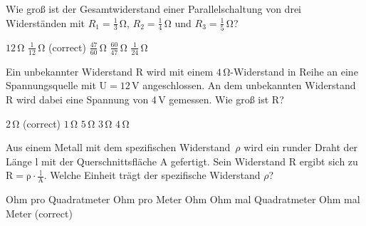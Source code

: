 \documentclass[11pt]{exam}
\begin{document}
\setlength{\voffset}{-0.5in}
\setlength{\headsep}{5pt}

\hspace{2mm}
 \hspace{5mm}
\vspace{4mm}

\begin{questions}

\question Wie groß ist der Gesamtwiderstand einer Parallelschaltung von drei Widerständen mit \(R_1=\mathrm{\frac{1}{3}\,\Omega}\), \(R_2=\mathrm{\frac{1}{4}\,\Omega}\) und \(R_3=\mathrm{\frac{1}{5}\,\Omega}\)?

\begin{choices}
	\choice \(\mathrm{12\,\Omega}\)
	\choice \(\mathrm{\frac{1}{12}\,\Omega}\) (correct)
	\choice \(\mathrm{\frac{47}{60}\,\Omega}\)
	\choice \(\mathrm{\frac{60}{47}\,\Omega}\)
	\choice \(\mathrm{\frac{1}{24}\,\Omega}\)
\end{choices}

\vspace{3mm}\question Ein unbekannter Widerstand \(\mathrm{R}\) wird mit einem \(\mathrm{4\,\Omega}\)-Widerstand in Reihe an eine Spannungsquelle mit \(\mathrm{U=12\,V}\) angeschlossen. An dem unbekannten Widerstand \(\mathrm{R}\) wird dabei eine Spannung von \(\mathrm{4\,V}\) gemessen. Wie groß ist \(\mathrm{R}\)?

\begin{choices}
	\choice \(\mathrm{2\,\Omega}\) (correct)
	\choice \(\mathrm{1\,\Omega}\)
	\choice \(\mathrm{5\,\Omega}\)
	\choice \(\mathrm{3\,\Omega}\)
	\choice \(\mathrm{4\,\Omega}\)
\end{choices}

\vspace{3mm}\question Aus einem Metall mit dem spezifischen Widerstand \(\rho\) wird ein runder Draht der Länge \(\mathrm{l}\) mit der Querschnittsfläche \(\mathrm{A}\) gefertigt. Sein Widerstand \(\mathrm{R}\) ergibt sich zu \(\mathrm{R=\rho \cdot \frac{l}{A}}\). Welche Einheit trägt der spezifische Widerstand \(\rho\)?

\begin{choices}
	\choice Ohm pro Quadratmeter
	\choice Ohm pro Meter
	\choice Ohm
	\choice Ohm mal Quadratmeter
	\choice Ohm mal Meter (correct)
\end{choices}


\end{questions}
\end{document}
